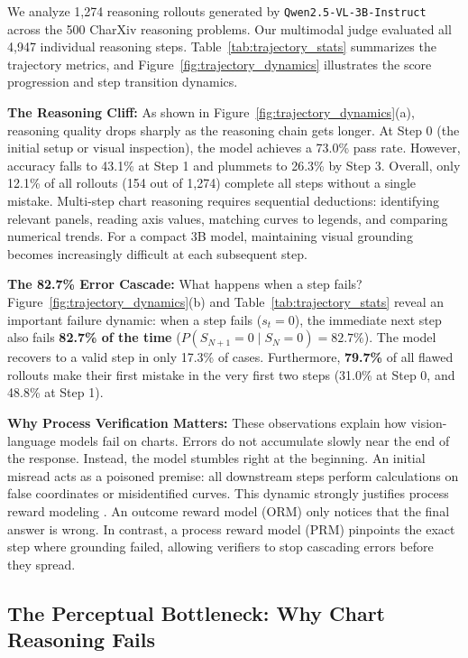 \documentclass[11pt]{article}
\begin{document}
We analyze 1,274 reasoning rollouts generated by \texttt{Qwen2.5-VL-3B-Instruct} \citep{bai2025qwen25vl} across the 500 CharXiv \citep{wang2024charxiv} reasoning problems. Our multimodal judge evaluated all 4,947 individual reasoning steps. Table~\ref{tab:trajectory_stats} summarizes the trajectory metrics, and Figure~\ref{fig:trajectory_dynamics} illustrates the score progression and step transition dynamics.

\textbf{The Reasoning Cliff:} As shown in Figure~\ref{fig:trajectory_dynamics}(a), reasoning quality drops sharply as the reasoning chain gets longer. At Step 0 (the initial setup or visual inspection), the model achieves a 73.0\% pass rate. However, accuracy falls to 43.1\% at Step 1 and plummets to 26.3\% by Step 3. Overall, only 12.1\% of all rollouts (154 out of 1,274) complete all steps without a single mistake. Multi-step chart reasoning requires sequential deductions: identifying relevant panels, reading axis values, matching curves to legends, and comparing numerical trends. For a compact 3B model, maintaining visual grounding becomes increasingly difficult at each subsequent step.

\textbf{The 82.7\% Error Cascade:} What happens when a step fails? Figure~\ref{fig:trajectory_dynamics}(b) and Table~\ref{tab:trajectory_stats} reveal an important failure dynamic: when a step fails ($s_t = 0$), the immediate next step also fails \textbf{82.7\% of the time} ($P(S_{N+1}=0 \mid S_N=0) = 82.7\%$). The model recovers to a valid step in only 17.3\% of cases. Furthermore, \textbf{79.7\%} of all flawed rollouts make their first mistake in the very first two steps (31.0\% at Step 0, and 48.8\% at Step 1).

\textbf{Why Process Verification Matters:} These observations explain how vision-language models fail on charts. Errors do not accumulate slowly near the end of the response. Instead, the model stumbles right at the beginning. An initial misread acts as a poisoned premise: all downstream steps perform calculations on false coordinates or misidentified curves. This dynamic strongly justifies process reward modeling \citep{lightman2023prm}. An outcome reward model (ORM) only notices that the final answer is wrong. In contrast, a process reward model (PRM) pinpoints the exact step where grounding failed, allowing verifiers to stop cascading errors before they spread.

\subsection{The Perceptual Bottleneck: Why Chart Reasoning Fails}
\label{subsec:perceptual_bottleneck}
\end{document}
